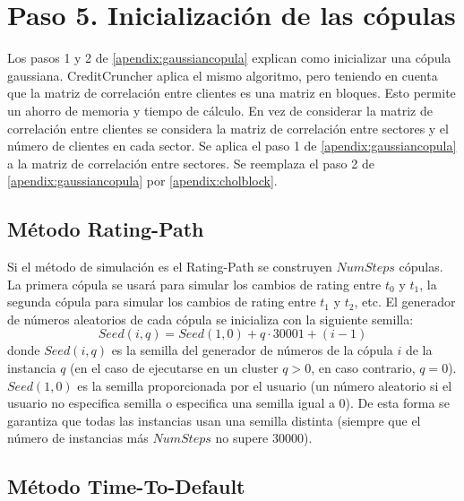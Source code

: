 \section{Paso 5. Inicializaci\'on de las c\'opulas}

Los pasos 1 y 2 de \ref{apendix:gaussiancopula} explican como
inicializar una c\'opula gaussiana. CreditCruncher aplica el 
mismo algoritmo, pero teniendo en cuenta que la matriz de
correlaci\'on entre clientes es una matriz en bloques. Esto
permite un ahorro de memoria y tiempo de c\'alculo. En vez de
considerar la matriz de correlaci\'on entre clientes se
considera la matriz de correlaci\'on entre sectores y el
n\'umero de clientes en cada sector. Se aplica el paso 1
de \ref{apendix:gaussiancopula} a la matriz de correlaci\'on
entre sectores. Se reemplaza el paso 2 de \ref{apendix:gaussiancopula}
por \ref{apendix:cholblock}.


\subsection{M\'etodo Rating-Path}

Si el m\'etodo de simulaci\'on es el Rating-Path se construyen
$NumSteps$ c\'opulas. La primera c\'opula se usar\'a para simular
los cambios de rating entre $t_0$ y $t_1$, la segunda c\'opula
para simular los cambios de rating entre $t_1$ y $t_2$, etc.
\newline
\newline
El generador de n\'umeros aleatorios de cada c\'opula se
inicializa con la siguiente semilla:
\begin{displaymath}
Seed(i,q) = Seed(1,0) + q \cdot 30001 + (i-1)
\end{displaymath}
donde $Seed(i,q)$ es la semilla del generador de n\'umeros de la
c\'opula $i$ de la instancia $q$ (en el caso de ejecutarse en un
cluster $q>0$, en caso contrario, $q=0$). $Seed(1,0)$ es la semilla
proporcionada por el usuario (un n\'umero aleatorio si el usuario no
especifica semilla o especifica una semilla igual a 0). De esta
forma se garantiza que todas las instancias usan una semilla distinta
(siempre que el n\'umero de instancias m\'as $NumSteps$ no supere 30000).

\subsection{M\'etodo Time-To-Default}

